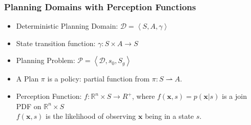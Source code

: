 \documentclass{beamer}
\def\R{\mathbb{R}}
\def\bx{\pmb{x}}
\def\PD{\mathcal{D}}
\def\PP{\mathcal{P}}
\begin{document}
\begin{frame}
\frametitle{Planning Domains with  Perception Functions}

\begin{itemize}
\item 
Deterministic Planning Domain: $\PD=\left<S,A,\gamma\right>$
\item 
State transition function: $\gamma: S \times A \rightarrow S$
\item
Planning Problem: $\PP= \left<\PD,s_0,S_g\right>$
\item
A Plan $\pi$ is a policy:
partial function from $\pi: S  \rightharpoonup A$.  
\pause
\item
{\color {red} Perception Function:  $f:\R^n\times S\rightarrow R^+$}, where $f(\bx,s) = p(\bx|s)$ is a join PDF on $\R^n\times S$\\
{\color {red} $f(\bx,s)$ is the likelihood of observing $\bx$ being in a state
$s$.}
\end{itemize}  
\end{frame}
\end{document}
